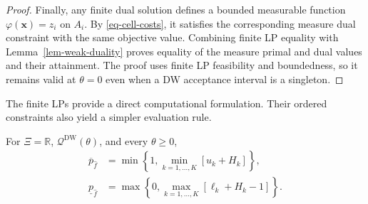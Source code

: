 \begin{proof}
  Finally, any finite dual solution defines a bounded measurable function $\varphi(\bm x)=z_i$ on $A_i$. By \eqref{eq-cell-costs}, it satisfies the corresponding measure dual constraint with the same objective value. Combining finite LP equality with Lemma~\ref{lem-weak-duality} proves equality of the measure primal and dual values and their attainment. The proof uses finite LP feasibility and boundedness, so it remains valid at $\theta=0$ even when a DW acceptance interval is a singleton.
\end{proof}

The finite LPs provide a direct computational formulation. Their ordered constraints also yield a simpler evaluation rule.

\begin{corollary}
  \label{thm-closed-form-bounds}
  For $\Xi=\mathbb R$, $\mathscr Q^{\mathrm{DW}}(\theta)$, and every $\theta\ge0$,
  \begin{align}
    \overline p_{\hat f}
    &=\min\left\{1,\min_{k=1,\ldots,K}\left[u_k+H_k\right]\right\},
    \label{eq-dw-closed-upper}\\
    \underline p_{\hat f}
    &=\max\left\{0,\max_{k=1,\ldots,K}\left[\ell_k+H_k-1\right]\right\}.
    \label{eq-dw-closed-lower}
  \end{align}
\end{corollary}
